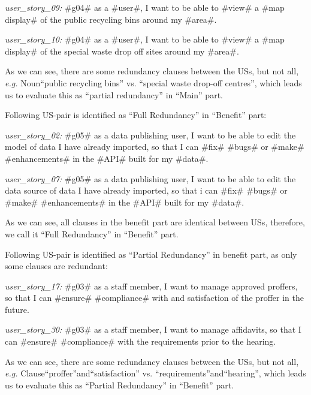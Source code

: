 \begin{itemize}
\begin{example}
		\textit{user\_story\_09:} \#g04\# as a \#user\#, I want to be able to \#view\# a \#map display\# of the public recycling bins around my \#area\#.
		
		\textit{user\_story\_10:} \#g04\# as a \#user\#, I want to be able to \#view\# a \#map display\# of the special waste drop off sites around my \#area\#.
		
		As we can see, there are some redundancy clauses between the USs, but not all, \textit{e.g.} Noun\enquote{public recycling bins} vs. \enquote{special waste drop-off centres}, which leads us to evaluate this as \enquote{partial redundancy} in \enquote{Main} part.
	\end{example}
	\begin{example}
		Following US-pair is identified as \enquote{Full Redundancy} in \enquote{Benefit} part:
		
		\textit{user\_story\_02:} \#g05\# as a data publishing user, I want to be able to edit the model of data I have already imported, so that I can \#fix\# \#bugs\# or \#make\# \#enhancements\# in the \#API\# built for my \#data\#.
		
		\textit{user\_story\_07:} \#g05\# as a data publishing user, I want to be able to edit the data source of data I have already imported, so that i can \#fix\# \#bugs\# or \#make\# \#enhancements\# in the \#API\# built for my \#data\#.
		
		As we can see, all clauses in the benefit part are identical between USs, therefore, we call it \enquote{Full Redundancy} in \enquote{Benefit} part.
	\end{example}
	\begin{example}
	Following US-pair is identified as \enquote{Partial Redundancy} in benefit part, as only some clauses are redundant:
	
	\textit{user\_story\_17:} \#g03\# as a staff member, I want to manage approved proffers, so that I can \#ensure\# \#compliance\# with and satisfaction of the proffer in the future.
	
	\textit{user\_story\_30:} \#g03\# as a staff member, I want to manage affidavits, so that I can \#ensure\# \#compliance\# with the requirements prior to the hearing.
	
	As we can see, there are some redundancy clauses between the USs, but not all, \textit{e.g.} Clause\enquote{proffer}and\enquote{satisfaction} vs. \enquote{requirements}and\enquote{hearing}, which leads us to evaluate this as \enquote{Partial Redundancy} in \enquote{Benefit} part.
	\end{example}
	
\end{itemize}
%
